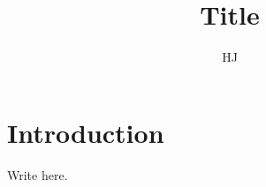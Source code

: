 \documentclass{article}
\title{Title}
\author{HJ}
\makeatletter
\renewcommand{\maketitle}{%
    \begin{center}
        {\Large\bfseries \@title\par}\vspace{0.1em}
        {\normalsize \@author\par}\vspace{0.1em}
        {\small \@date\par}
    \end{center}\vspace{0.4em}
}
\makeatother
\begin{document}
\maketitle
\section{Introduction}
Write here.
\end{document}
